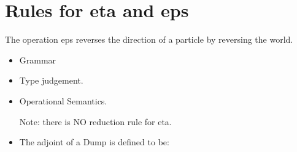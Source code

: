 \documentclass[preprint]{easychair}
\begin{document}
\section{Rules for {{eta}} and {{eps}} }

The operation {{eps}} reverses the direction of a particle by reversing the world. 

\begin{itemize}
\item Grammar

\item
Type judgement.




\item
Operational Semantics.

Note: there is NO reduction rule for {{eta}}. 

\item
The adjoint of a Dump is defined to be:

\end{itemize}









\end{document}
